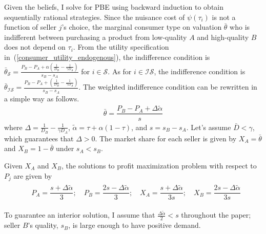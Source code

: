 \documentclass[12pt]{article}
\begin{document}
Given the beliefs, I solve for PBE using backward induction to obtain sequentially rational strategies. Since the nuisance cost of $\psi(\tau_i)$ is not a function of seller $j$'s choice, the marginal consumer type on valuation $\bar{\theta}$ who is indifferent between purchasing a product from low-quality $A$ and high-quality $B$ does not depend on $\tau_i$. From the utility specification in~(\ref{consumer_utility_endogenous}), the indifference condition is $\bar{\theta}_{\mathcal{S}} = \frac{P_B-P_A+\alpha(\frac{1}{D_B}-\frac{1}{\gamma D_A})}{s_B-s_A}$  for $i \in \mathcal{S}$. As for $i \in \mathcal{IS}$, the indifference condition is $\bar{\theta}_{\mathcal{IS}} = \frac{P_B-P_A+(\frac{1}{D_B}-\frac{1}{\gamma D_A})}{s_B-s_A}$. The weighted indifference condition can be rewritten in a simple way as follows.
\begin{align}\label{marginal theta}
\bar{\theta} = \dfrac{P_B-P_A+\Delta\tilde{\alpha}}{ s}
\end{align} 
where  $\Delta  =\frac{1}{D_B}-\frac{1}{\gamma D_A}$, $\tilde{\alpha}=\tau+\alpha(1-\tau)$, and  $s = s_B-s_A$. Let's assume $\bar{D}<\gamma$, which guarantees that $\Delta>0$. The market share for each seller is given by $ X_A = \bar{\theta}$ and $X_B =1-\bar{\theta}$ under $s_A<s_B$.

 Given $X_A $ and $X_B $, the solutions to profit maximization problem with respect to $P_j$ are given by 
\begin{align}\label{eqmpriceshare}
\begin{aligned}
&P_A = \dfrac{s+\Delta \tilde{\alpha}}{3}; \quad P_B = \dfrac{ 2s-\Delta\tilde{\alpha}}{3}; \quad X_A = \dfrac{s +\Delta \tilde{\alpha}}{3s}; \quad X_B= \dfrac{ 2s -\Delta \tilde{\alpha}}{3s}
\end{aligned}
\end{align}

To guarantee an interior solution, I assume that $\frac{\Delta\tilde{\alpha}}{2}<s$ throughout the paper; seller $B$'s quality, $s_B$, is large enough to have positive demand. 
\end{document}
